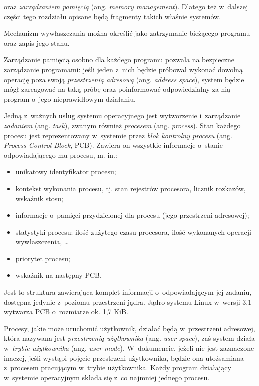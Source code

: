 \documentclass[12pt]{mwart}
\begin{document}
  oraz \emph{zarządzaniem pamięcią} (ang. \emph{memory management}). Dlatego też w~dalszej części tego rozdziału opisane będą fragmenty takich właśnie systemów.
\par
%
\indent
  Mechanizm wywłaszczania można określić jako zatrzymanie bieżącego programu oraz zapis jego stanu.
\par
%
\indent
  Zarządzanie pamięcią osobno dla każdego programu pozwala na bezpieczne zarządzanie programami: jeśli jeden z~nich będzie próbował wykonać dowolną operację
  poza swoją \emph{przestrzenią adresową} (ang. \emph{address space}), system będzie mógł zareagować na taką próbę oraz poinformować odpowiedzialny za nią program
  o~jego nieprawidłowym działaniu.
\par
%
\indent
  Jedną z~ważnych usług systemu operacyjnego jest wytworzenie i~zarządzanie \emph{zadaniem} (ang. \emph{task}), zwanym również \emph{procesem}
  (ang. \emph{process}). Stan każdego procesu jest reprezentowany w~systemie przez \emph{blok kontrolny procesu} (ang. \emph{Process Control Block}, PCB).
  Zawiera on wszystkie informacje o~stanie odpowiadającego mu procesu, m. in.:
  \begin{itemize}
    \item unikatowy identyfikator procesu;
    \item kontekst wykonania procesu, tj. stan rejestrów procesora, licznik rozkazów, wskaźnik stosu;
    \item informacje o~pamięci przydzielonej dla procesu (jego przestrzeni adresowej);
    \item statystyki procesu: ilość zużytego czasu procesora, ilość wykonanych operacji wywłaszczenia, \ldots
    \item priorytet procesu;
    \item wskaźnik na następny PCB.
  \end{itemize}
  Jest to struktura zawierająca komplet informacji o~odpowiadającym jej zadaniu, dostępna jedynie z~poziomu przestrzeni jądra.
  Jądro systemu Linux w~wersji 3.1 wytwarza PCB o~rozmiarze ok. 1,7 KiB.
\par
%
\indent
  Procesy, jakie może uruchomić użytkownik, działać będą w~przestrzeni adresowej, która nazywana jest \emph{przestrzenią użytkownika} (ang. \emph{user space}), zaś
  system działa w~\emph{trybie użytkownika} (ang. \emph{user mode}). W~dokumencie, jeżeli nie jest zaznaczone inaczej,
  jeśli wystąpi pojęcie przestrzeni użytkownika, będzie ona utożsamiana z~procesem pracującym w~trybie użytkownika.
  Każdy program działający w~systemie operacyjnym składa się z~co najmniej jednego procesu.
\end{document}
